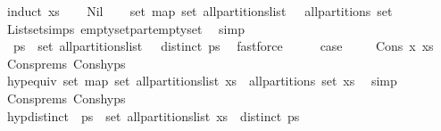 \begin{isabellebody}
%
\isadelimproof
%
\endisadelimproof
%
\isatagproof
{}\isamarkupfalse%
\ {\isacharparenleft}induct\ xs{\isacharparenright}\isanewline
\ \ \isamarkupfalse%
\ Nil\isanewline
\ \ \isamarkupfalse%
\ {\isachardoublequoteopen}set\ {\isacharparenleft}map\ set\ {\isacharparenleft}all{\isacharunderscore}partitions{\isacharunderscore}list\ {\isacharbrackleft}{\isacharbrackright}{\isacharparenright}{\isacharparenright}\ {\isacharequal}\ all{\isacharunderscore}partitions\ {\isacharparenleft}set\ {\isacharbrackleft}{\isacharbrackright}{\isacharparenright}{\isachardoublequoteclose}\isanewline
\ \ \ \ \isamarkupfalse%
\ List{\isachardot}set{\isacharunderscore}simps{\isacharparenleft}{}{\isacharparenright}\ emptyset{\isacharunderscore}part{\isacharunderscore}emptyset{}\ \isamarkupfalse%
\ simp\isanewline
\ \ \ \ \isanewline
\ \ \isamarkupfalse%
\ \isamarkupfalse%
\ {\isachardoublequoteopen}{\isasymforall}\ ps\ {\isasymin}\ set\ {\isacharparenleft}all{\isacharunderscore}partitions{\isacharunderscore}list\ {\isacharbrackleft}{\isacharbrackright}{\isacharparenright}\ {\isachardot}\ distinct\ ps{\isachardoublequoteclose}\ \isamarkupfalse%
\ fastforce\isanewline
\ \ \isamarkupfalse%
\ \isamarkupfalse%
\ {\isacharquery}case\ \isacommand{{\isachardot}{\isachardot}}\isamarkupfalse%
\isanewline
{}\isamarkupfalse%
\isanewline
\ \ \isamarkupfalse%
\ {\isacharparenleft}Cons\ x\ xs{\isacharparenright}\isanewline
\ \ \isamarkupfalse%
\ Cons{\isachardot}prems\ Cons{\isachardot}hyps\isanewline
\ \ \ \ \isamarkupfalse%
\ hyp{\isacharunderscore}equiv{\isacharcolon}\ {\isachardoublequoteopen}set\ {\isacharparenleft}map\ set\ {\isacharparenleft}all{\isacharunderscore}partitions{\isacharunderscore}list\ xs{\isacharparenright}{\isacharparenright}\ {\isacharequal}\ all{\isacharunderscore}partitions\ {\isacharparenleft}set\ xs{\isacharparenright}{\isachardoublequoteclose}\ \isamarkupfalse%
\ simp\isanewline
\ \ \isamarkupfalse%
\ Cons{\isachardot}prems\ Cons{\isachardot}hyps\isanewline
\ \ \ \ \isamarkupfalse%
\ hyp{\isacharunderscore}distinct{\isacharcolon}\ {\isachardoublequoteopen}{\isasymforall}\ ps\ {\isasymin}\ set\ {\isacharparenleft}all{\isacharunderscore}partitions{\isacharunderscore}list\ xs{\isacharparenright}\ {\isachardot}\ distinct\ ps{\isachardoublequoteclose}\ \isamarkupfalse%

\end{isabellebody}
